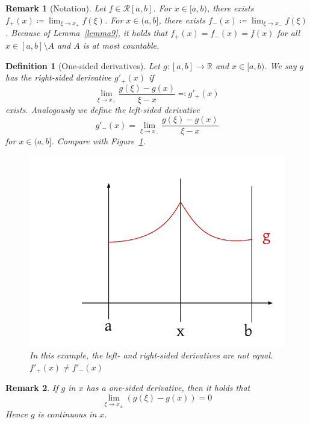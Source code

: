 \documentclass{article}
\newtheorem{definition}{Definition}  \numberwithin{definition}{section}
\newtheorem{remark}{Remark}  \numberwithin{remark}{section}
\begin{document}
\begin{remark}[Notation]
  Let $f \in \mathcal R[a,b]$. For $x \in [a,b)$, there exists $f_+(x) \coloneqq \lim_{\xi \to x_+} f(\xi)$.
  For $x \in (a,b]$, there exists $f_-(x) \coloneqq \lim_{\xi \to x_-} f(\xi)$.
  Because of Lemma~\ref{lemma9}, it holds that $f_+(x) = f_-(x) = f(x)$ for all $x \in [a,b] \setminus A$ and $A$ is at most countable.
\end{remark}

\begin{definition}[One-sided derivatives] %
  Let $g: [a,b] \to \mathbb R$ and $x \in [a,b)$.
  We say $g$ has the \emph{right-sided derivative} $g'_+(x)$ if
  \[ \lim_{\xi \to x_+} \frac{g(\xi) - g(x)}{\xi - x} \eqqcolon g'_+(x) \]
  exists. Analogously we define the left-sided derivative
  \[ g'_-(x) = \lim_{\xi \to x_-} \frac{g(\xi) - g(x)}{\xi - x} \]
  for $x \in (a,b]$. Compare with Figure~\ref{img:lrderiv}.

  \begin{figure}[!h]
    \begin{center}
      \includegraphics{img/19_left_right_sided_derivative.pdf}
      \caption{In this example, the left- and right-sided derivatives are not equal. $f'_+(x) \neq f'_-(x)$}
      \label{img:lrderiv}
    \end{center}
  \end{figure}
\end{definition}

\begin{remark}
  If $g$ in $x$ has a one-sided derivative, then it holds that
  \[ \lim_{\xi \to x_\pm} (g(\xi) - g(x)) = 0 \]
  Hence $g$ is continuous in $x$.
\end{remark}
\end{document}
